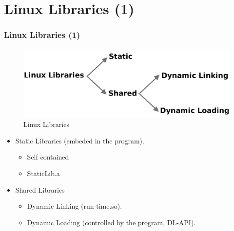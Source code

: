 \documentclass[aspectratio=169, xcolor=table, notheorems, hyperref={pdfpagelabels=false}]{beamer}
\begin{document}
\section{Linux Libraries (1)}
\begin{frame}
\frametitle{Linux Libraries (1)}

\begin{figure}
\includegraphics[width=0.71\linewidth]{os04-linux-lib}
\caption{Linux Libraries}
\end{figure}

\begin{itemize}
\item Static Libraries (embeded in the program).
\begin{itemize}
\item Self contained
\item StaticLib.a
\end{itemize}
\item Shared Libraries
\begin{itemize}
\item Dynamic Linking (run-time.so).
\item Dynamic Loading (controlled by the program, DL-API).
\end{itemize}
\end{itemize}

\end{frame}

\end{document}
